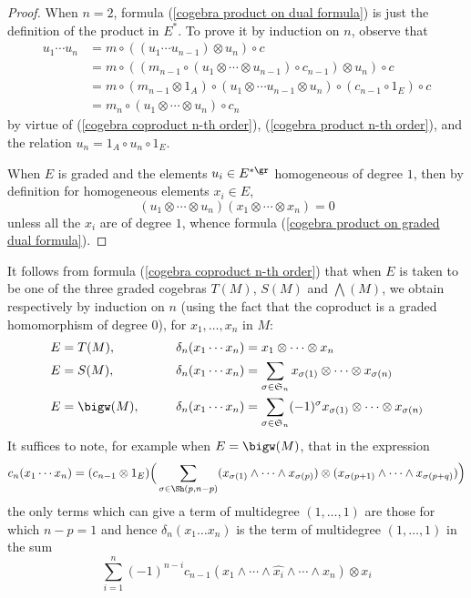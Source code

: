 \begin{proof}
When $n=2$, formula (\ref{cogebra product on dual formula}) is just the definition of the product in $E^*$. To prove it by induction on $n$, observe that
\begin{align*}
u_1\cdots u_n&=m\circ((u_1\cdots u_{n-1})\otimes u_n)\circ c\\
&=m\circ((m_{n-1}\circ(u_1\otimes\cdots\otimes u_{n-1})\circ c_{n-1})\otimes u_n)\circ c\\
&=m\circ (m_{n-1}\otimes 1_A)\circ(u_1\otimes\cdots u_{n-1}\otimes u_n)\circ(c_{n-1}\circ 1_E)\circ c\\
&=m_n\circ(u_1\otimes\cdots\otimes u_n)\circ c_n
\end{align*}
by virtue of (\ref{cogebra coproduct n-th order}), (\ref{cogebra product n-th order}), and the relation $u_n=1_A\circ u_n\circ 1_E$.\par
When $E$ is graded and the elements $u_i\in E^{*\gr}$ homogeneous of degree $1$, then by definition for homogeneous elements $x_i\in E$,
\[(u_1\otimes\cdots\otimes u_n)(x_1\otimes\cdots\otimes x_n)=0\]
unless all the $x_i$ are of degree $1$, whence formula (\ref{cogebra product on graded dual formula}).
\end{proof}
It follows from formula (\ref{cogebra coproduct n-th order}) that when $E$ is taken to be one of the three graded cogebras $T(M)$, $S(M)$ and $\bigwedge(M)$, we obtain respectively by induction on $n$ (using the fact that the coproduct is a graded homomorphism of degree $0$), for $x_1,\dots,x_n$ in $M$:
\begin{alignat*}{3}
E&=T(M),&\quad&&\delta_n(x_1\cdots x_n)&=x_1\otimes\cdots\otimes x_n\\
E&=S(M),&\quad&&\delta_n(x_1\cdots x_n)&=\sum_{\sigma\in\mathfrak{S}_n}x_{\sigma(1)}\otimes\cdots\otimes x_{\sigma(n)}\\
E&=\bigw(M),&\quad&&\delta_n(x_1\cdots x_n)&=\sum_{\sigma\in\mathfrak{S}_n}(-1)^\sigma x_{\sigma(1)}\otimes\cdots\otimes x_{\sigma(n)}
\end{alignat*}
It suffices to note, for example when $E=\bigw(M)$, that in the expression
\[c_n(x_1\cdots x_n)=(c_{n-1}\otimes 1_E)\Big(\sum_{\sigma\in\Sh(p,n-p)}(x_{\sigma(1)}\wedge\cdots\wedge x_{\sigma(p)})\otimes(x_{\sigma(p+1)}\wedge\cdots\wedge x_{\sigma(p+q)})\Big)\]
the only terms which can give a term of multidegree $(1,\dots,1)$ are those for which $n-p=1$ and hence $\delta_n(x_1\dots x_n)$ is the term of multidegree $(1,\dots,1)$ in the sum
\[\sum_{i=1}^{n}(-1)^{n-i}c_{n-1}(x_1\wedge\cdots\wedge\widehat{x_i}\wedge\cdots\wedge x_n)\otimes x_i\]
